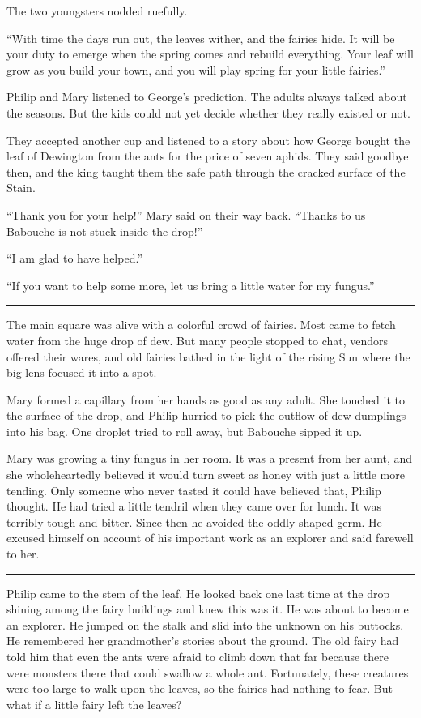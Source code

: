 \documentclass[10pt, draft]{memoir}
\renewcommand{\pfbreakdisplay}{\bigskip \ding{166} \bigskip}
\newcommand{\secbreak}{\fancybreak{\pfbreakdisplay}}
\begin{document}
The two youngsters nodded ruefully.

``With time the days run out, the leaves wither, and the fairies hide. It will be your duty to emerge when the spring comes and rebuild everything. Your leaf will grow as you build your town, and you will play spring for your little fairies.”

Philip and Mary listened to George's prediction. The adults always talked about the seasons. But the kids could not yet decide whether they really existed or not.

They accepted another cup and listened to a story about how George bought the leaf of Dewington from the ants for the price of seven aphids. They said goodbye then, and the king taught them the safe path through the cracked surface of the Stain.

``Thank you for your help!'' Mary said on their way back. ``Thanks to us Babouche is not stuck inside the drop!''

``I am glad to have helped.''

``If you want to help some more, let us bring a little water for my fungus.''

\secbreak

The main square was alive with a colorful crowd of fairies. Most came to fetch water from the huge drop of dew. But many people stopped to chat, vendors offered their wares, and old fairies bathed in the light of the rising Sun where the big lens focused it into a spot.

Mary formed a capillary from her hands as good as any adult. She touched it to the surface of the drop, and Philip hurried to pick the outflow of dew dumplings into his bag. One droplet tried to roll away, but Babouche sipped it up.

Mary was growing a tiny fungus in her room. It was a present from her aunt, and she wholeheartedly believed it would turn sweet as honey with just a little more tending. Only someone who never tasted it could have believed that, Philip thought. He had tried a little tendril when they came over for lunch. It was terribly tough and bitter. Since then he avoided the oddly shaped germ. He excused himself on account of his important work as an explorer and said farewell to her.

\secbreak

Philip came to the stem of the leaf. He looked back one last time at the drop shining among the fairy buildings and knew this was it. He was about to become an explorer. He jumped on the stalk and slid into the unknown on his buttocks. He remembered her grandmother's stories about the ground. The old fairy had told him that even the ants were afraid to climb down that far because there were monsters there that could swallow a whole ant. Fortunately, these creatures were too large to walk upon the leaves, so the fairies had nothing to fear. But what if a little fairy left the leaves?
\end{document}
